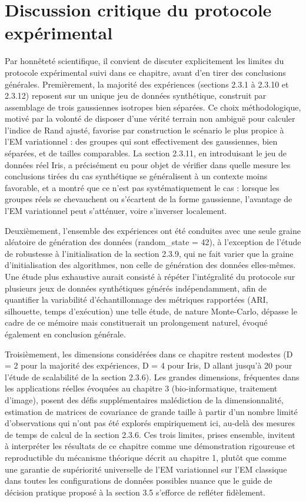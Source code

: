 \section{Discussion critique du protocole expérimental}
Par honnêteté scientifique, il convient de discuter explicitement les limites du protocole expérimental suivi dans ce chapitre, avant d'en tirer des conclusions générales. Premièrement, la majorité des expériences (sections 2.3.1 à 2.3.10 et 2.3.12) reposent sur un unique jeu de données synthétique, construit par assemblage de trois gaussiennes isotropes bien séparées. Ce choix méthodologique, motivé par la volonté de disposer d'une vérité terrain non ambiguë pour calculer l'indice de Rand ajusté, favorise par construction le scénario le plus propice à l'EM variationnel : des groupes qui sont effectivement des gaussiennes, bien séparées, et de tailles comparables. La section 2.3.11, en introduisant le jeu de données réel Iris, a précisément eu pour objet de vérifier dans quelle mesure les conclusions tirées du cas synthétique se généralisent à un contexte moins favorable, et a montré que ce n'est pas systématiquement le cas : lorsque les groupes réels se chevauchent ou s'écartent de la forme gaussienne, l'avantage de l'EM variationnel peut s'atténuer, voire s'inverser localement.

Deuxièmement, l'ensemble des expériences ont été conduites avec une seule graine aléatoire de génération des données (random\_state = 42), à l'exception de l'étude de robustesse à l'initialisation de la section 2.3.9, qui ne fait varier que la graine d'initialisation des algorithmes, non celle de génération des données elles-mêmes. Une étude plus exhaustive aurait consisté à répéter l'intégralité du protocole sur plusieurs jeux de données synthétiques générés indépendamment, afin de quantifier la variabilité d'échantillonnage des métriques rapportées (ARI, silhouette, temps d'exécution)  une telle étude, de nature Monte-Carlo, dépasse le cadre de ce mémoire mais constituerait un prolongement naturel, évoqué également en conclusion générale.

Troisièmement, les dimensions considérées dans ce chapitre restent modestes (D = 2 pour la majorité des expériences, D = 4 pour Iris, D allant jusqu'à 20 pour l'étude de scalabilité de la section 2.3.6). Les grandes dimensions, fréquentes dans les applications réelles évoquées au chapitre 3 (bio-informatique, traitement d'image), posent des défis supplémentaires  malédiction de la dimensionnalité, estimation de matrices de covariance de grande taille à partir d'un nombre limité d'observations  qui n'ont pas été explorés empiriquement ici, au-delà des mesures de temps de calcul de la section 2.3.6. Ces trois limites, prises ensemble, invitent à interpréter les résultats de ce chapitre comme une démonstration rigoureuse et reproductible du mécanisme théorique décrit au chapitre 1, plutôt que comme une garantie de supériorité universelle de l'EM variationnel sur l'EM classique dans toutes les configurations de données possibles  nuance que le guide de décision pratique proposé à la section 3.5 s'efforce de refléter fidèlement.

